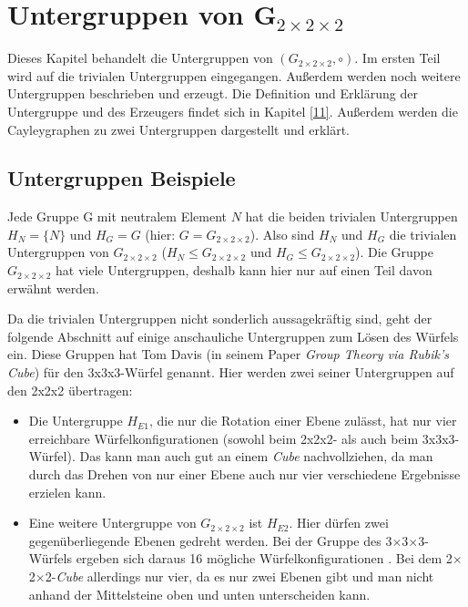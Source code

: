 \documentclass[12pt,a4paper, usenames, dvipsnames]{article}
\newcommand{\Gtwo}{\ensuremath{G_{2\times 2\times 2}}}
\newcommand{\Ttwo}{2$\times$2$\times$2-}
\newcommand{\Tthree}{3$\times$3$\times$3-}
\begin{document}
%
%
%
%
%
%
%
%
%
%
%
%
%
%
%
%
%
%
%
%
\newpage

\section{Untergruppen von G$_{2\times 2\times 2}$}

Dieses Kapitel behandelt die Untergruppen von $(\Gtwo, \circ)$. Im ersten Teil wird auf die trivialen Untergruppen eingegangen. Außerdem werden noch weitere Untergruppen beschrieben und erzeugt.
Die Definition und Erklärung der Untergruppe und des Erzeugers findet sich in Kapitel \ref{11}.
Außerdem werden die Cayleygraphen zu zwei Untergruppen dargestellt und erklärt.

%
%
%
%
%
%
%
%
%
%
%
%
%
%
%
%
%
%
%
%
\subsection*{Untergruppen Beispiele}



Jede Gruppe G mit neutralem Element $N$ hat die beiden trivialen Untergruppen ${H_N = \{N\}}$ und $H_G=G$ (hier: $G=\Gtwo$). Also sind $H_N$ und $H_G$ die trivialen Untergruppen von $\Gtwo$ ($H_N \leqslant \Gtwo$ und $H_G \leqslant \Gtwo$).
Die Gruppe $\Gtwo$ hat viele Untergruppen, deshalb kann hier nur auf einen Teil davon erwähnt werden. 


Da die trivialen Untergruppen nicht sonderlich aussagekräftig sind, geht der folgende Abschnitt auf einige anschauliche Untergruppen zum Lösen des Würfels ein. Diese Gruppen hat Tom Davis (in seinem Paper \textit{Group Theory via Rubik's Cube}) \cite{TD} für den 3x3x3-Würfel genannt. Hier werden zwei seiner Untergruppen auf den 2x2x2 übertragen: 
\begin{itemize}
\item Die Untergruppe $H_{E1}$, die nur die Rotation einer Ebene zulässt, hat nur vier erreichbare Würfelkonfigurationen (sowohl beim 2x2x2- als auch beim 3x3x3-Würfel). Das kann man auch gut an einem \textit{Cube} nachvollziehen, da man durch das Drehen von nur einer Ebene auch nur vier verschiedene Ergebnisse erzielen kann.
\item Eine weitere Untergruppe von $\Gtwo$ ist $H_{E2}$. Hier dürfen zwei gegenüberliegende Ebenen gedreht werden. 
Bei der Gruppe des \Tthree Würfels ergeben sich daraus 16 mögliche Würfelkonfigurationen \cite{TD}. Bei dem \Ttwo \textit{Cube} allerdings nur vier, da es nur zwei Ebenen gibt und man nicht anhand der Mittelsteine oben und unten unterscheiden kann.
\end{itemize}
\end{document}
